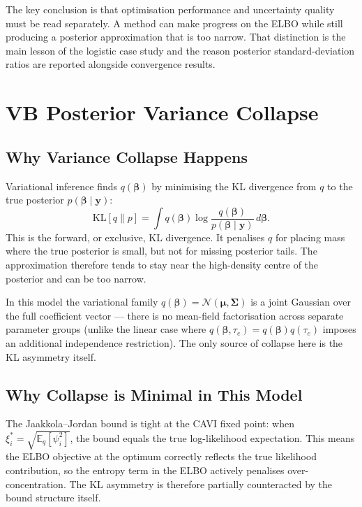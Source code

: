 \documentclass[11pt,a4paper]{article}
\newcommand{\E}{\mathbb{E}}
\newcommand{\N}{\mathcal{N}}
\begin{document}
The key conclusion is that optimisation performance and uncertainty quality must
be read separately. A method can make progress on the ELBO while still producing
a posterior approximation that is too narrow. That distinction is the main lesson
of the logistic case study and the reason posterior standard-deviation ratios are
reported alongside convergence results.

\printbibliography

\appendix
\renewcommand{\thesection}{Appendix~\Alph{section}}

\newpage
\section{VB Posterior Variance Collapse}
\label{app:vb-collapse}

\subsection*{Why Variance Collapse Happens}

Variational inference finds $q(\bm{\beta})$ by minimising the KL divergence from $q$
to the true posterior $p(\bm{\beta}\mid\bm{y})$:
\begin{equation}
  \mathrm{KL}[q \| p] = \int q(\bm{\beta}) \log \frac{q(\bm{\beta})}{p(\bm{\beta}\mid\bm{y})} \, d\bm{\beta}.
\end{equation}
This is the forward, or exclusive, KL divergence.
It penalises $q$ for placing mass where the true posterior is small, but not for
missing posterior tails.
The approximation therefore tends to stay near the high-density centre of the posterior
and can be too narrow.

In this model the variational family $q(\bm{\beta}) = \N(\bm{\mu}, \bm{\Sigma})$ is a
joint Gaussian over the full coefficient vector --- there is no mean-field factorisation
across separate parameter groups (unlike the linear case where $q(\bm{\beta},\tau_e) =
q(\bm{\beta})q(\tau_e)$ imposes an additional independence restriction).
The only source of collapse here is the KL asymmetry itself.

\subsection*{Why Collapse is Minimal in This Model}

The Jaakkola--Jordan bound is tight at the CAVI fixed point: when
$\xi_i^* = \sqrt{\E_q[\psi_i^2]}$, the bound equals the true log-likelihood expectation.
This means the ELBO objective at the optimum correctly reflects the true likelihood
contribution, so the entropy term in the ELBO actively penalises over-concentration.
The KL asymmetry is therefore partially counteracted by the bound structure itself.
\end{document}
